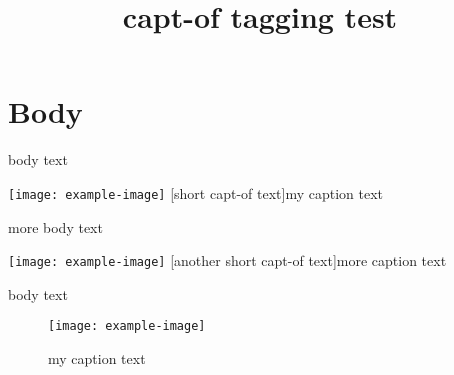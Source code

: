 \documentclass{article}
\title{capt-of tagging test}
\begin{document}
\listoffigures

\section{Body}
body text
\begin{center}
\texttt{[image: example-image]}
[short capt-of text]{my caption text}
\end{center}

more body text
\begin{center}
\texttt{[image: example-image]}
[another short capt-of text]{more caption text}
\end{center}

body text
\begin{figure}
\centering
\texttt{[image: example-image]}
\caption[short caption text]{my caption text}
\end{figure}
\end{document}

